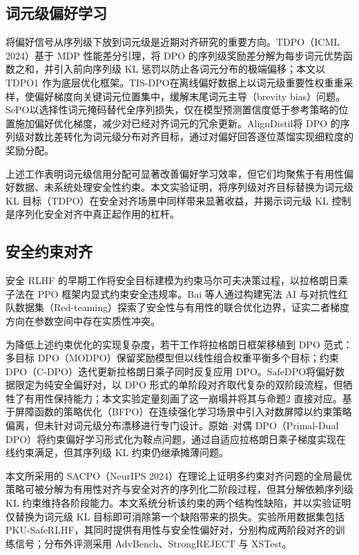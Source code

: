 \documentclass[lettersize,journal]{IEEEtran}
\begin{document}
\subsection{词元级偏好学习}

将偏好信号从序列级下放到词元级是近期对齐研究的重要方向。TDPO\cite{zeng2024token}（ICML 2024）基于 MDP 性能差分引理，将 DPO 的序列级奖励差分解为每步词元优势函数之和，并引入前向序列级 KL 惩罚以防止各词元分布的极端偏移；本文以 TDPO1 作为底层优化框架。TIS-DPO\cite{wang2023tisdpo}在离线偏好数据上以词元级重要性权重重采样，使偏好梯度向关键词元位置集中，缓解末尾词元主导（brevity bias）问题。SePO\cite{chen2024sepo}以选择性词元掩码替代全序列损失，仅在模型预测置信度低于参考策略的位置施加偏好优化梯度，减少对已经对齐词元的冗余更新。AlignDistil\cite{liu2024aligndistil}将 DPO 的序列级对数比差转化为词元级分布对齐目标，通过对偏好回答逐位蒸馏实现细粒度的奖励分配。

上述工作表明词元级信用分配可显著改善偏好学习效率，但它们均聚焦于有用性偏好数据、未系统处理安全性约束。本文实验证明，将序列级对齐目标替换为词元级 KL 目标（TDPO）在安全对齐场景中同样带来显著收益，并揭示词元级 KL 控制是序列化安全对齐中真正起作用的杠杆。

\subsection{安全约束对齐}

安全 RLHF 的早期工作将安全目标建模为约束马尔可夫决策过程，以拉格朗日乘子法在 PPO 框架内显式约束安全违规率\cite{dai2023safe}。Bai 等人\cite{bai2022training}通过构建宪法 AI 与对抗性红队数据集（Red-teaming\cite{ganguli2022red}）探索了安全性与有用性的联合优化边界，证实二者梯度方向在参数空间中存在实质性冲突。

为降低上述约束优化的实现复杂度，若干工作将拉格朗日框架移植到 DPO 范式：多目标 DPO（MODPO）\cite{zhou2024beyond}保留奖励模型但以线性组合权重平衡多个目标；约束 DPO（C-DPO）\cite{liu2024enhancing}迭代更新拉格朗日乘子同时反复应用 DPO。SafeDPO\cite{kim2025safedpo}将偏好数据限定为纯安全偏好对，以 DPO 形式的单阶段对齐取代复杂的双阶段流程，但牺牲了有用性保持能力；本文实验定量刻画了这一崩塌并将其与命题2 直接对应。基于屏障函数的策略优化（BFPO）\cite{zhang2025bfpo}在连续强化学习场景中引入对数屏障以约束策略偏离，但未针对词元级分布漂移进行专门设计。原始–对偶 DPO（Primal-Dual DPO）\cite{zhao2024primaldual}将约束偏好学习形式化为鞍点问题，通过自适应拉格朗日乘子梯度实现在线约束满足，但其序列级 KL 约束仍继承摊薄问题。

本文所采用的 SACPO\cite{wachi2024stepwise}（NeurIPS 2024）在理论上证明多约束对齐问题的全局最优策略可被分解为有用性对齐与安全对齐的序列化二阶段过程，但其分解依赖序列级 KL 约束维持各阶段能力。本文系统分析该约束的两个结构性缺陷，并以实验证明仅替换为词元级 KL 目标即可消除第一个缺陷带来的损失。实验所用数据集包括 PKU-SafeRLHF\cite{ji2024beavertails}，其同时提供有用性与安全性偏好对，分别构成两阶段对齐的训练信号；分布外评测采用 AdvBench\cite{zou2023universal}、StrongREJECT\cite{souly2024strongreject} 与 XSTest\cite{rottger2024xstest}。
\end{document}
